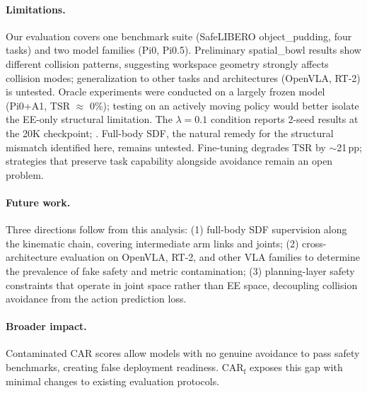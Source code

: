 \paragraph{Limitations.}
Our evaluation covers one benchmark suite (SafeLIBERO object\_pudding, four tasks) and two model families (Pi0, Pi0.5). Preliminary spatial\_bowl results show different collision patterns, suggesting workspace geometry strongly affects collision modes; generalization to other tasks and architectures (OpenVLA, RT-2) is untested. Oracle experiments were conducted on a largely frozen model (Pi0+A1, TSR ${\approx}$ 0\%); testing on an actively moving policy would better isolate the EE-only structural limitation. The $\lambda = 0.1$ condition reports 2-seed results at the 20K checkpoint; . Full-body SDF, the natural remedy for the structural mismatch identified here, remains untested. Fine-tuning degrades TSR by ${\sim}$21\,pp; strategies that preserve task capability alongside avoidance remain an open problem.

\paragraph{Future work.}
Three directions follow from this analysis: (1) full-body SDF supervision along the kinematic chain, covering intermediate arm links and joints; (2) cross-architecture evaluation on OpenVLA, RT-2, and other VLA families to determine the prevalence of fake safety and metric contamination; (3) planning-layer safety constraints that operate in joint space rather than EE space, decoupling collision avoidance from the action prediction loss.

\paragraph{Broader impact.}
Contaminated CAR scores allow models with no genuine avoidance to pass safety benchmarks, creating false deployment readiness. CAR$_\text{f}$ exposes this gap with minimal changes to existing evaluation protocols.
